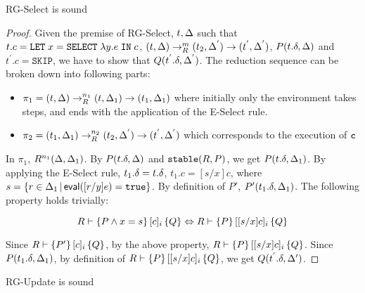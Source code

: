 \documentclass[acmlarge,anonymous]{acmart}\settopmatter{printfolios=true}
\begin{document}
\begin{theorem}
RG-Select is sound
\end{theorem}

\begin{proof}
Given the premise of RG-Select, $t, \Delta$ such that $t.c = {\tt LET}\;x=\texttt{SELECT}\;\lambda y.e\;{\tt IN}\;c$, $(t, \Delta) \rightarrow_{R}^{m} (t_2, \Delta^{'}) \rightarrow (t^{'}, \Delta^{'})$, $P(t.\delta, \Delta)$ and $t^{'}.c = \texttt{SKIP}$, we have to show that $Q(t^{'}.\delta, \Delta^{'})$. The reduction sequence can be broken down into following parts:

\begin{itemize}
\item $\pi_1 = (t, \Delta) \rightarrow_{R}^{n_1} (t, \Delta_1) \rightarrow (t_1, \Delta_1)$ where initially only the environment takes steps, and ends with the application of the E-Select rule.
\item $\pi_2 = (t_1, \Delta_1) \rightarrow_{R}^{n_2} (t_2, \Delta^{'}) \rightarrow (t^{'}, \Delta^{'}) $ which corresponds to the execution of ${\tt c}$
\end{itemize}

In $\pi_1$, $R^{n_1}(\Delta, \Delta_1)$. By $P(t.\delta, \Delta)$ and $\mathtt{stable}(R, P)$, we get $P(t.\delta, \Delta_1)$. By applying the E-Select rule, $t_1.\delta = t.\delta$, $t_1.c = [s/x]c$, where $s = \{r\in\Delta_1 \,|\, \textsf{eval}([r/y]e)={\tt true}\}$. By definition of $P'$, $P'(t_1.\delta, \Delta_1)$. The following property holds trivially:

$$
R \vdash \{P \wedge x = s\}\,\lbrack c \rbrack_i\,\{Q\} \Leftrightarrow R \vdash \{P\}\,\lbrack [s/x]c \rbrack_i\,\{Q\}
$$

Since $R \vdash \{P'\}\,\lbrack c \rbrack_i\,\{Q\}$, by the above property, $R \vdash \{P\}\,\lbrack [s/x]c \rbrack_i\,\{Q\}$. Since $P(t_1.\delta, \Delta_1)$, by definition of $R \vdash \{P\}\,\lbrack [s/x]c \rbrack_i\,\{Q\}$, we get $Q(t^{'}.\delta, \Delta')$.


\end{proof}

\begin{theorem}
RG-Update is sound
\end{theorem}
\end{document}

